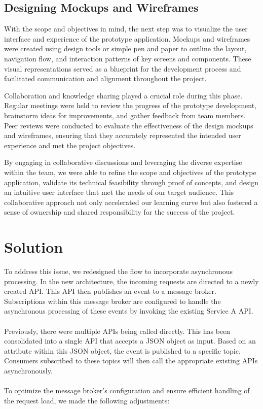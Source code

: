 \documentclass[12pt,a4paper]{report}
\begin{document}
\subsection{Designing Mockups and Wireframes}

With the scope and objectives in mind, the next step was to visualize the user interface and experience of the prototype application. Mockups and wireframes were created using design tools or simple pen and paper to outline the layout, navigation flow, and interaction patterns of key screens and components. These visual representations served as a blueprint for the development process and facilitated communication and alignment throughout the project.

Collaboration and knowledge sharing played a crucial role during this phase. Regular meetings were held to review the progress of the prototype development, brainstorm ideas for improvements, and gather feedback from team members. Peer reviews were conducted to evaluate the effectiveness of the design mockups and wireframes, ensuring that they accurately represented the intended user experience and met the project objectives.

By engaging in collaborative discussions and leveraging the diverse expertise within the team, we were able to refine the scope and objectives of the prototype application, validate its technical feasibility through proof of concepts, and design an intuitive user interface that met the needs of our target audience. This collaborative approach not only accelerated our learning curve but also fostered a sense of ownership and shared responsibility for the success of the project.


\section{Solution}

To address this issue, we redesigned the flow to incorporate asynchronous processing. In the new architecture, the incoming requests are directed to a newly created API. This API then publishes an event to a message broker. Subscriptions within this message broker are configured to handle the asynchronous processing of these events by invoking the existing Service A API.
\\\\
\noindent Previously, there were multiple APIs being called directly. This has been consolidated into a single API that accepts a JSON object as input. Based on an attribute within this JSON object, the event is published to a specific topic. Consumers subscribed to these topics will then call the appropriate existing APIs asynchronously.
\\\\
\noindent To optimize the message broker's configuration and ensure efficient handling of the request load, we made the following adjustments:
\end{document}
